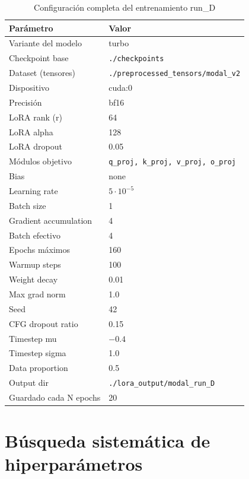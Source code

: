 \documentclass[%
    school=etsisi,%
    type=pfg,%
    degree=61CD,%
]{upm-report}
\begin{document}
\begin{table}[H]
    \centering
    \caption{Configuraci\'on completa del entrenamiento run\_D}
    \label{tab:run-d-config}
    \small
    \begin{tabular}{lp{7cm}}
        \toprule
        \textbf{Par\'ametro} & \textbf{Valor} \\
        \midrule
        Variante del modelo & turbo \\
        Checkpoint base & \texttt{./checkpoints} \\
        Dataset (tensores) & \texttt{./preprocessed\_tensors/modal\_v2} \\
        Dispositivo & cuda:0 \\
        Precisi\'on & bf16 \\
        \midrule
        LoRA rank (r) & 64 \\
        LoRA alpha & 128 \\
        LoRA dropout & 0.05 \\
        M\'odulos objetivo & \texttt{q\_proj, k\_proj, v\_proj, o\_proj} \\
        Bias & none \\
        \midrule
        Learning rate & $5 \cdot 10^{-5}$ \\
        Batch size & 1 \\
        Gradient accumulation & 4 \\
        Batch efectivo & 4 \\
        Epochs m\'aximos & 160 \\
        Warmup steps & 100 \\
        Weight decay & 0.01 \\
        Max grad norm & 1.0 \\
        Seed & 42 \\
        \midrule
        CFG dropout ratio & 0.15 \\
        Timestep mu & $-0.4$ \\
        Timestep sigma & 1.0 \\
        Data proportion & 0.5 \\
        \midrule
        Output dir & \texttt{./lora\_output/modal\_run\_D} \\
        Guardado cada N epochs & 20 \\
        \bottomrule
    \end{tabular}
\end{table}

\section{B\'usqueda sistem\'atica de hiperpar\'ametros}
\label{s:stage1-sweep}
\end{document}
